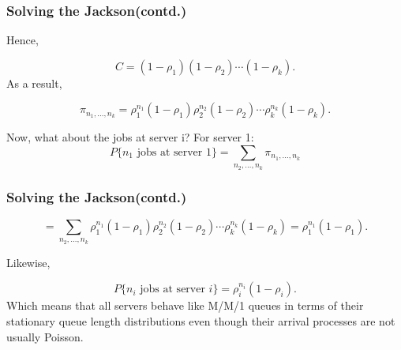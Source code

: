\documentclass[10pt,notes]{beamer}
\begin{document}
\begin{frame}
    \frametitle{Solving the Jackson(contd.)}
    Hence,
    
    \[
    C = (1 - \rho_1) (1 - \rho_2) \cdots (1 - \rho_k).
    \]
    As a result,
    
    \[
    \pi_{n_1,\ldots,n_k} = \rho_1^{n_1} (1 - \rho_1) \rho_2^{n_2} (1 - \rho_2) \cdots \rho_k^{n_k} (1 - \rho_k).
    \]

    
    Now, what about the jobs at server i?
    For server 1:
    \[
    P\{n_1 \text{ jobs at server } 1\} = \sum_{n_2,\ldots,n_k} \pi_{n_1,\ldots,n_k}
    \]
    
\end{frame}

\begin{frame}
    \frametitle{Solving the Jackson(contd.)}
    \[
    = \sum_{n_2,\ldots,n_k} \rho_1^{n_1} (1 - \rho_1) \rho_2^{n_2} (1 - \rho_2) \cdots \rho_k^{n_k} (1 - \rho_k) = \rho_1^{n_1} (1 - \rho_1).
    \]
    
    Likewise,
    
    \[
    P\{n_i \text{ jobs at server } i\} = \rho_i^{n_i} (1 - \rho_i).
    \]
    Which means that all servers behave like M/M/1 queues in terms of their stationary queue length distributions even though their arrival processes are not usually Poisson.
\end{frame}
\end{document}
